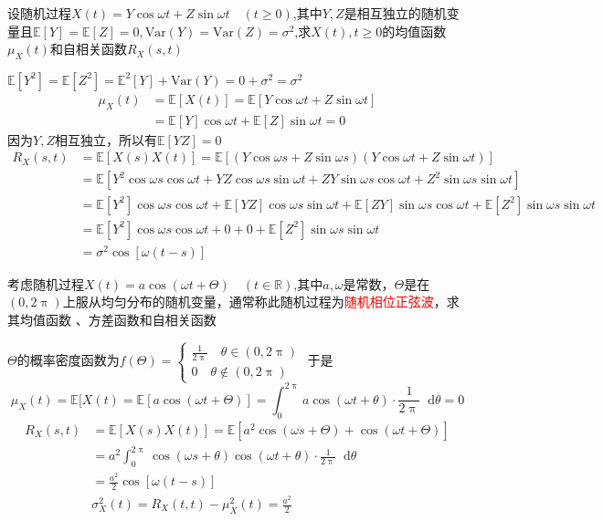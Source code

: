 \documentclass{elegantbook}
\newcommand\var{\text{Var}}
\renewcommand\d{\mathop{}\!\mathrm{d}}
\newcommand\E{\mathbb{E}}
\begin{document}
\begin{example}
    设随机过程$X(t)=Y\cos \omega t+Z\sin \omega t\quad (t\geq 0)$,其中$Y,Z$是相互独立的随机变量且$\E [Y]=\E [Z]=0,\var (Y)=\var (Z)=\sigma ^2$,求$X(t),t\geq 0$的均值函数$\mu _X(t)$和自相关函数$R_X(s,t)$
    \begin{solution}
        $\E [Y^2]=\E [Z^2]=\E ^2[Y]+\var (Y)=0+\sigma ^2=\sigma ^2$
        \[\begin{aligned}
            \mu _X(t)&=\E [X(t)]=\E [Y\cos \omega t+Z\sin \omega t]\\
            &=\E [Y]\cos \omega t+\E [Z]\sin \omega t=0
        \end{aligned}\]
        因为$Y,Z$相互独立，所以有$\E [YZ]=0$
        \[\begin{aligned}
            R_X(s,t)&=\E [X(s)X(t)]=\E [(Y\cos \omega s+Z\sin \omega s)(Y\cos \omega t+Z\sin \omega t)]\\
            &=\E [Y^2\cos \omega s \cos \omega t+YZ\cos \omega s \sin \omega t+ZY\sin \omega s \cos \omega t+Z^2\sin \omega s \sin \omega t]\\
            &=\E [Y^2]\cos \omega s \cos \omega t+\E [YZ]\cos \omega s \sin \omega t+\E [ZY]\sin \omega s \cos \omega t+\E [Z^2]\sin \omega s \sin \omega t\\
            &=\E [Y^2]\cos \omega s \cos \omega t+0+0+\E [Z^2]\sin \omega s \sin \omega t\\
            &=\sigma ^2\cos [\omega(t-s)]
        \end{aligned}\]
    \end{solution}
\end{example}

\begin{example}
    考虑随机过程$X(t)=a\cos (\omega t+\Theta)\quad (t\in \mathbb{R})$,其中$a,\omega$是常数，$\Theta$是在$(0,2\uppi)$上服从均匀分布的随机变量，通常称此随机过程为\textcolor{red}{随机相位正弦波}，求其均值函数 、方差函数和自相关函数
    \begin{solution}
        $\Theta$的概率密度函数为$f(\Theta)=\begin{cases}
            \frac{1}{2\uppi}\quad \theta \in (0,2\uppi)\\
            0\quad \theta \not \in (0,2\uppi)
        \end{cases}$
        于是\[\mu _X(t)=\E [X(t)=\E [a\cos (\omega t+\Theta)]=\int_{0}^{2\uppi}a\cos (\omega t+\theta)\cdot \frac{1}{2\uppi}\d \theta=0\]
        \[\begin{aligned}
            R_X(s,t)&=\E [X(s)X(t)]=\E [a^2\cos (\omega s+\Theta)+\cos (\omega t+\Theta )]\\
            &=a^2\int_{0}^{2\uppi}\cos (\omega s+\theta)\cos (\omega t+\theta)\cdot \frac{1}{2\uppi}\d \theta \\
            &=\frac{a^2}{2}\cos [\omega(t-s)]\\
            &\sigma _X^2(t)=R_X(t,t)-\mu _X^2(t)=\frac{a^2}{2}
        \end{aligned}\]
    \end{solution}
\end{example}
\end{document}
